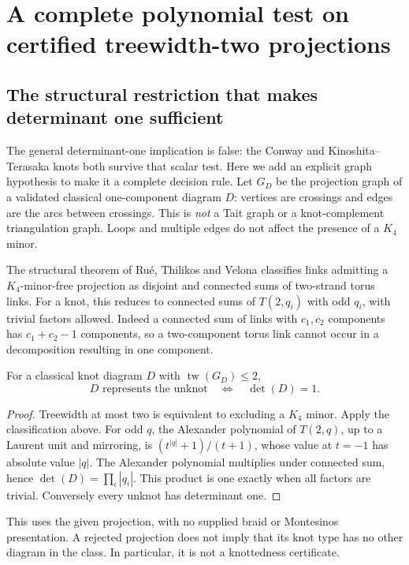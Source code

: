 \section{A complete polynomial test on certified treewidth-two projections}
\label{sec:treewidth-two}

\subsection{The structural restriction that makes determinant one sufficient}

The general determinant-one implication is false: the Conway and
Kinoshita--Terasaka knots both survive that scalar test.  Here we add an
explicit graph hypothesis to make it a complete decision rule.  Let $G_D$
be the projection graph of a validated classical one-component diagram $D$:
vertices are crossings and edges are the arcs between crossings.  This is
\emph{not} a Tait graph or a knot-complement triangulation graph.
Loops and multiple edges do not affect the presence of a $K_4$ minor.

The structural theorem of Ru\'e, Thilikos and Velona
\cite{rue-thilikos-velona} classifies links admitting a $K_4$-minor-free
projection as disjoint and connected sums of two-strand torus links.
For a knot, this reduces to connected sums of $T(2,q_i)$ with odd $q_i$,
with trivial factors allowed.  Indeed a connected sum of links with
$c_1,c_2$ components has $c_1+c_2-1$ components, so a two-component torus
link cannot occur in a decomposition resulting in one component.

\begin{proposition}
For a classical knot diagram $D$ with $\operatorname{tw}(G_D)\le2$,
\[
 D\text{ represents the unknot}\quad\Longleftrightarrow\quad
 \det(D)=1.
\]
\end{proposition}
\begin{proof}
Treewidth at most two is equivalent to excluding a $K_4$ minor.  Apply the
classification above.  For odd $q$, the Alexander polynomial of $T(2,q)$,
up to a Laurent unit and mirroring, is
$(t^{|q|}+1)/(t+1)$, whose value at $t=-1$ has absolute value $|q|$.
The Alexander polynomial multiplies under connected sum, hence
$\det(D)=\prod_i |q_i|$.  This product is one exactly when all factors
are trivial.  Conversely every unknot has determinant one.
\end{proof}

This uses the given projection, with no supplied braid or Montesinos
presentation.  A rejected projection does not imply that its knot type
has no other diagram in the class.  In particular, it is not a
knottedness certificate.

